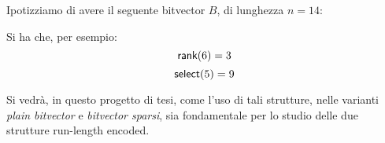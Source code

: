 \begin{esempio}
  Ipotizziamo di avere il seguente bitvector $B$, di lunghezza $n=14$:
  \begin{center}
  \end{center}
  Si ha che, per esempio:
  \[\mbox{\rm {\sf rank}}(6)=3\]
  \[\mbox{\rm {\sf select}}(5) =9\]
\end{esempio}
Si vedrà, in questo progetto di tesi, come l'uso di
tali strutture, nelle varianti \textit{plain bitvector} e
\textit{bitvector sparsi}, sia fondamentale per lo studio delle due strutture
run-length encoded.


